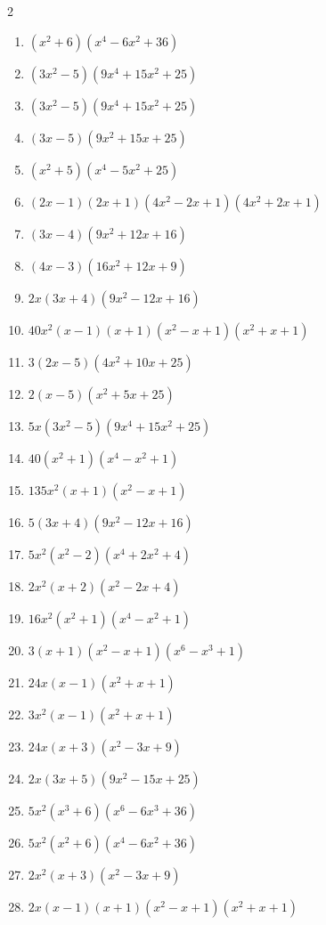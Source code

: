\documentclass[11pt,oneside]{book}
\begin{document}
\begin{multicols}{2}
\begin{enumerate}[leftmargin=*,label=\textbf{D\arabic*.},itemsep=0.45\baselineskip]
\item $ \left(x^{2} + 6\right) \left(x^{4} - 6 x^{2} + 36\right) $
\item $ \left(3 x^{2} - 5\right) \left(9 x^{4} + 15 x^{2} + 25\right) $
\item $ \left(3 x^{2} - 5\right) \left(9 x^{4} + 15 x^{2} + 25\right) $
\item $ \left(3 x - 5\right) \left(9 x^{2} + 15 x + 25\right) $
\item $ \left(x^{2} + 5\right) \left(x^{4} - 5 x^{2} + 25\right) $
\item $ \left(2 x - 1\right) \left(2 x + 1\right) \left(4 x^{2} - 2 x + 1\right) \left(4 x^{2} + 2 x + 1\right) $
\item $ \left(3 x - 4\right) \left(9 x^{2} + 12 x + 16\right) $
\item $ \left(4 x - 3\right) \left(16 x^{2} + 12 x + 9\right) $
\item $ 2 x \left(3 x + 4\right) \left(9 x^{2} - 12 x + 16\right) $
\item $ 40 x^{2} \left(x - 1\right) \left(x + 1\right) \left(x^{2} - x + 1\right) \left(x^{2} + x + 1\right) $
\item $ 3 \left(2 x - 5\right) \left(4 x^{2} + 10 x + 25\right) $
\item $ 2 \left(x - 5\right) \left(x^{2} + 5 x + 25\right) $
\item $ 5 x \left(3 x^{2} - 5\right) \left(9 x^{4} + 15 x^{2} + 25\right) $
\item $ 40 \left(x^{2} + 1\right) \left(x^{4} - x^{2} + 1\right) $
\item $ 135 x^{2} \left(x + 1\right) \left(x^{2} - x + 1\right) $
\item $ 5 \left(3 x + 4\right) \left(9 x^{2} - 12 x + 16\right) $
\item $ 5 x^{2} \left(x^{2} - 2\right) \left(x^{4} + 2 x^{2} + 4\right) $
\item $ 2 x^{2} \left(x + 2\right) \left(x^{2} - 2 x + 4\right) $
\item $ 16 x^{2} \left(x^{2} + 1\right) \left(x^{4} - x^{2} + 1\right) $
\item $ 3 \left(x + 1\right) \left(x^{2} - x + 1\right) \left(x^{6} - x^{3} + 1\right) $
\item $ 24 x \left(x - 1\right) \left(x^{2} + x + 1\right) $
\item $ 3 x^{2} \left(x - 1\right) \left(x^{2} + x + 1\right) $
\item $ 24 x \left(x + 3\right) \left(x^{2} - 3 x + 9\right) $
\item $ 2 x \left(3 x + 5\right) \left(9 x^{2} - 15 x + 25\right) $
\item $ 5 x^{2} \left(x^{3} + 6\right) \left(x^{6} - 6 x^{3} + 36\right) $
\item $ 5 x^{2} \left(x^{2} + 6\right) \left(x^{4} - 6 x^{2} + 36\right) $
\item $ 2 x^{2} \left(x + 3\right) \left(x^{2} - 3 x + 9\right) $
\item $ 2 x \left(x - 1\right) \left(x + 1\right) \left(x^{2} - x + 1\right) \left(x^{2} + x + 1\right) $
\end{enumerate}
\end{multicols}
\end{document}
